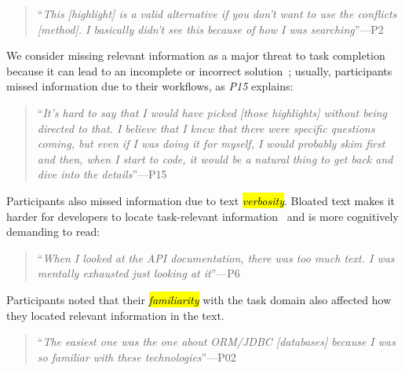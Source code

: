 \smallskip
\begin{footnotesize}
\begin{quote}
    ``\textit{This [highlight] is a valid alternative if you don't want to use the conflicts [method]. I basically didn't see this because of how I was searching}''---P2
\end{quote}
\end{footnotesize}




We consider missing relevant information as a major threat to task completion because it can lead to an incomplete or incorrect solution~\cite{Murphy2005};
usually, participants missed information due to their workflows, as \textit{P15} explains:





\smallskip
\begin{footnotesize}
\begin{quote}
    ``\textit{It's hard to say that I would have picked [those highlights] without being directed to that. I believe that I knew that there were specific questions coming, but even if I was doing it for myself, I would probably skim first and then, when I start to code, it would be a natural thing to get back and dive into the details}''---P15
\end{quote}
\end{footnotesize}



Participants also missed information due to text \hl{\textit{verbosity}}. 
Bloated text makes it harder for developers to locate task-relevant information~\cite{robillard2011field} and is more cognitively demanding to read:


\smallskip
\begin{footnotesize}
\begin{quote}
    ``\textit{When I looked at the API documentation, there was too much text. I was mentally exhausted just looking at it}''---P6
\end{quote}
\end{footnotesize}


Participants noted that their \hl{\textit{familiarity}} with the task domain also affected how they located relevant information in the text.



\smallskip
\begin{footnotesize}
\begin{quote}
    ``\textit{The easiest one was the one about ORM/JDBC [databases] because I was so familiar with these technologies}''---P02
\end{quote}
\end{footnotesize}




